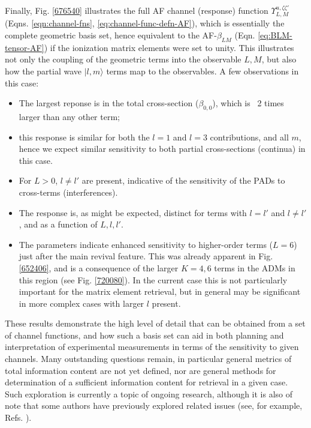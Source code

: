 \documentclass[10pt]{article}
\begin{document}
Finally, Fig. \ref{676540} illustrates the full AF channel (response) function $\varUpsilon_{L,M}^{u,\zeta\zeta'}$ (Eqns. \ref{eqn:channel-fns}, \ref{eq:channel-func-defn-AF}), which is essentially the complete geometric basis set,
hence equivalent to the AF-$\beta_{LM}$ (Eqn. \ref{eq:BLM-tensor-AF}) if the ionization matrix elements were set to unity. This illustrates not only the coupling of the geometric terms into the observable $L,M$, but also how the partial wave $|l,m\rangle$ terms map to the observables. %
A few observations in this case:

\begin{itemize}
\item The largest reponse is in the total cross-section ($\beta_{0,0}$), which is ~2 times larger than any other term; 
\item this response is similar for both the $l=1$ and $l=3$ contributions, and all $m$, hence we expect similar sensitivity to both partial cross-sections (continua) in this case.
\item For $L>0$, $l\neq l'$ are present, indicative of the sensitivity of the PADs to cross-terms (interferences).
\item The response is, as might be expected, distinct for terms with $l=l'$ and $l\neq l'$, and as a function of $L,l,l'$.
\item The parameters indicate enhanced sensitivity to higher-order terms ($L=6$) just after the main revival feature. This was already apparent in Fig. \ref{652406}, and is a consequence of the larger $K=4,6$ terms in the ADMs in this region (see Fig. \ref{720080}). In the current case this is not particularly important for the matrix element retrieval, but in general may be significant in more complex cases with larger $l$ present.

\end{itemize}

These results demonstrate the high level of detail that can be obtained from a set of channel functions, and how such a basis set can aid in both planning and interpretation of experimental measurements in terms of the sensitivity to given channels. Many outstanding questions remain, in particular general metrics of total information content are not yet defined, nor are general methods for determination of a sufficient information content for retrieval in a given case. Such exploration is currently a topic of ongoing research, although it is also of note that some authors have previously explored related issues (see, for example, Refs. \cite{Schmidtke2000,Ramakrishna2012}).
\end{document}
